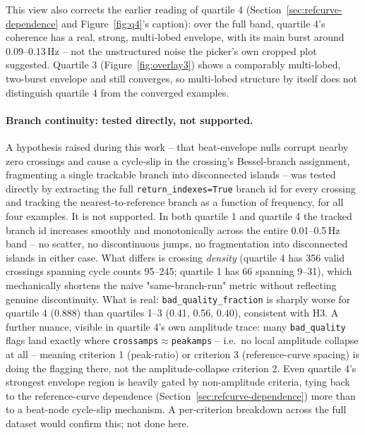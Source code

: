 \documentclass[11pt]{article}
\begin{document}
This view also corrects the earlier reading of quartile 4 (Section~\ref{sec:refcurve-dependence}
and Figure~\ref{fig:q4}'s caption): over the full band, quartile 4's coherence has a real, strong,
multi-lobed envelope, with its main burst around 0.09--0.13\,Hz -- not the unstructured noise the
picker's own cropped plot suggested. Quartile 3 (Figure~\ref{fig:overlay3}) shows a comparably
multi-lobed, two-burst envelope and still converges, so multi-lobed structure by itself does not
distinguish quartile 4 from the converged examples.

\paragraph{Branch continuity: tested directly, not supported.} A hypothesis raised during this
work -- that beat-envelope nulls corrupt nearby zero crossings and cause a cycle-slip in the
crossing's Bessel-branch assignment, fragmenting a single trackable branch into disconnected
islands -- was tested directly by extracting the full \texttt{return\_indexes=True} branch id for
every crossing and tracking the nearest-to-reference branch as a function of frequency, for all
four examples. It is not supported. In both quartile 1 and quartile 4 the tracked branch id
increases smoothly and monotonically across the entire 0.01--0.5\,Hz band -- no scatter, no
discontinuous jumps, no fragmentation into disconnected islands in either case. What differs is
crossing \emph{density} (quartile 4 has 356 valid crossings spanning cycle counts 95--245;
quartile 1 has 66 spanning 9--31), which mechanically shortens the naive "same-branch-run" metric
without reflecting genuine discontinuity. What is real: \texttt{bad\_quality\_fraction} is sharply
worse for quartile 4 (0.888) than quartiles 1--3 (0.41, 0.56, 0.40), consistent with H3. A further
nuance, visible in quartile 4's own amplitude trace: many \texttt{bad\_quality} flags land exactly
where \texttt{crossamps}$\approx$\texttt{peakamps} -- i.e.\ no local amplitude collapse at all --
meaning criterion 1 (peak-ratio) or criterion 3 (reference-curve spacing) is doing the flagging
there, not the amplitude-collapse criterion 2. Even quartile 4's strongest envelope region is
heavily gated by non-amplitude criteria, tying back to the reference-curve dependence
(Section~\ref{sec:refcurve-dependence}) more than to a beat-node cycle-slip mechanism. A
per-criterion breakdown across the full dataset would confirm this; not done here.
\end{document}

